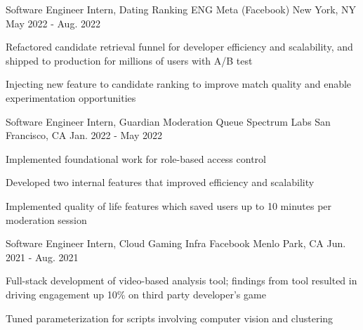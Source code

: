

\begin{cventries}
  \cventry
    {Software Engineer Intern, Dating Ranking ENG} %
    {Meta (Facebook)} %
    {New York, NY} %
    {May 2022 - Aug. 2022} %
    {
      \begin{cvitems} %
        \item {Refactored candidate retrieval funnel for developer efficiency and scalability, and shipped to production for millions of users with A/B test}
        \item {Injecting new feature to candidate ranking to improve match quality and enable experimentation opportunities}
      \end{cvitems}
    }

  \cventry
    {Software Engineer Intern, Guardian Moderation Queue} %
    {Spectrum Labs} %
    {San Francisco, CA} %
    {Jan. 2022 - May 2022} %
    {
      \begin{cvitems} %
         \item {Implemented foundational work for role-based access control}
        \item {Developed two internal features that improved efficiency and scalability}
        \item {Implemented quality of life features which saved users up to 10 minutes per moderation session}
      \end{cvitems}
    }

  \cventry
    {Software Engineer Intern, Cloud Gaming Infra} %
    {Facebook} %
    {Menlo Park, CA} %
    {Jun. 2021 - Aug. 2021} %
    {
      \begin{cvitems} %
        \item {Full-stack development of video-based analysis tool; findings from tool resulted in driving engagement up 10\% on third party developer's game}
        \item {Tuned parameterization for scripts involving computer vision and clustering}
      \end{cvitems}
    }


\end{cventries}
